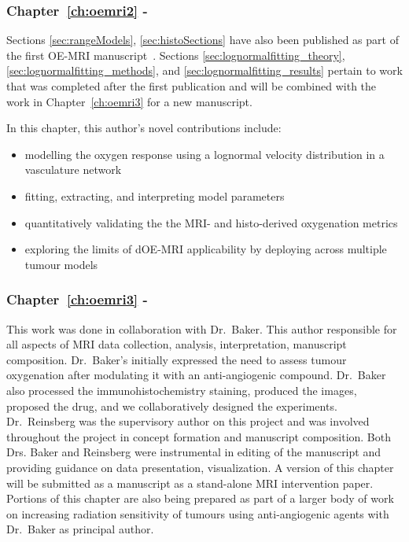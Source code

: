 \subsubsection{Chapter~\ref{ch:oemri2} - }
Sections \ref{sec:rangeModels}, \ref{sec:histoSections} have also been published as part of the first OE-MRI manuscript~\cite{Moosvi:2018ca}.
Sections \ref{sec:lognormalfitting_theory}, \ref{sec:lognormalfitting_methods}, and \ref{sec:lognormalfitting_results} pertain to work that was completed after the first publication and will be combined with the work in Chapter~\ref{ch:oemri3} for a new manuscript.

In this chapter, this author's novel contributions include:

\begin{itemize}
\item modelling the oxygen response using a lognormal velocity distribution in a vasculature network
\item fitting, extracting, and interpreting model parameters
\item quantitatively validating the the MRI- and histo-derived oxygenation metrics
\item exploring the limits of dOE-MRI applicability by deploying across multiple tumour models
\end{itemize}

\subsubsection{Chapter~\ref{ch:oemri3} - }

This work was done in collaboration with Dr.\ Baker.
This author responsible for all aspects of MRI data collection, analysis, interpretation, manuscript composition. 
Dr.\ Baker's initially expressed the need to assess tumour oxygenation after modulating it with an anti-angiogenic compound.
Dr.\ Baker also processed the immunohistochemistry staining, produced the images, proposed the drug, and we collaboratively designed the experiments. 
Dr.\ Reinsberg was the supervisory author on this project and was involved throughout the project in concept formation and manuscript composition. 
Both Drs. Baker and Reinsberg were instrumental in editing of the manuscript and providing guidance on data presentation, visualization.
A version of this chapter will be submitted as a manuscript as a stand-alone MRI intervention paper.
Portions of this chapter are also being prepared as part of a larger body of work on increasing radiation sensitivity of tumours using anti-angiogenic agents with Dr.\ Baker as principal author.

